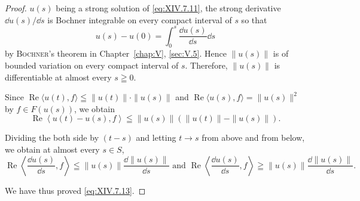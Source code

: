 \begin{proof}
 $u(s)$ being a strong solution of \eqref{eq:XIV.7.11}, the strong derivative $\dd u(s)/\dd s$ is Bochner integrable on every compact interval of $s$ so that 
\[
u (s) - u (0) = \int_{0} ^{s} \frac {\dd u (s)}{\dd s} \dd s
\]
by \textsc{Bochner}'s theorem in Chapter~\ref{chap:V}, \ref{sec:V.5}. Hence $\|u(s)\|$ is of bounded variation on every compact interval of $s$. Therefore, $\|u(s)\|$ is differentiable at almost every $s \geqq 0$. 

Since $\operatorname{Re}\langle u(t), f \rangle \leqq \|u(t)\| \cdot \|u(s)\|$ and $\operatorname{Re}\langle u(s), f \rangle = \|u(s)\|^2$ by $f \in F(u(s))$, we obtain 
\[
\operatorname{Re} \left\langle u (t) - u (s), f \right\rangle \leqq \| u (s) \| \left(\| u (t) \| - \| u (s) \|\right).
\]

Dividing the both side by $(t - s)$ and letting $t \rightarrow s$ from above and from below, we obtain at almost every $s \in S$, 
\[
\operatorname{Re} \left\langle \frac {\dd u (s)}{\dd s}, f \right\rangle \leqq \| u (s) \| \frac {\dd \| u (s) \|}{\dd s} \text{ and } \operatorname{Re} \left\langle \frac {\dd u (s)}{\dd s}, f \right\rangle \geqq \| u (s) \| \frac {\dd \| u (s) \|}{\dd s}.
\]

We have thus proved \eqref{eq:XIV.7.13}. 
\end{proof}

